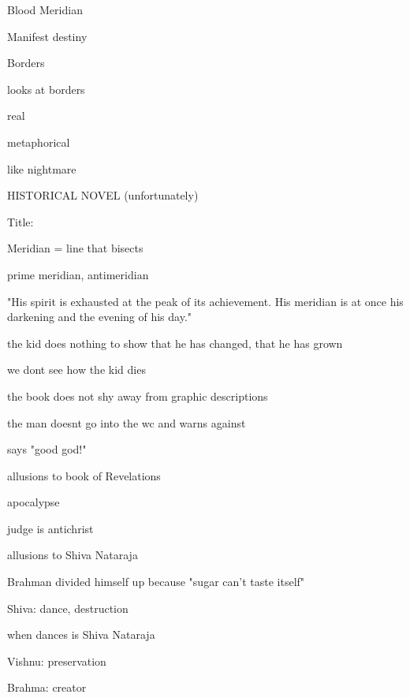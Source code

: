 \documentclass{article}
\begin{document}
Blood Meridian \begin{easylist} 
	\item Manifest destiny \begin{easylist}
	\item Borders \begin{easylist}
		\item looks at borders \begin{easylist}
			\item real
			\item metaphorical
	\item like nightmare
	\item HISTORICAL NOVEL (unfortunately)
	\item Title: \begin{easylist}
		\item Meridian = line that bisects \begin{easylist}
			\item prime meridian, antimeridian
			\item "His spirit is exhausted at the peak of its
			achievement. His meridian is at once his darkening and the evening of his day."
	\item the kid does nothing to show that he has changed, that he has grown
	\item we dont see how the kid dies \begin{easylist}
		\item the book does not shy away from graphic descriptions
		\item the man doesnt go into the wc and warns against
		\item says "good god!"
	\item allusions to book of Revelations \begin{easylist}
		\item apocalypse
		\item judge is antichrist
	\item allusions to Shiva Nataraja \begin{easylist}
		\item Brahman divided himself up because "sugar can't taste itself" \begin{easylist}
			\item Shiva: dance, destruction \begin{easylist}
				\item when dances is Shiva Nataraja
			\item Vishnu: preservation
			\item Brahma: creator

\end{easylist}
\end{easylist}
\end{easylist}
\end{easylist}
\end{easylist}
\end{easylist}
\end{easylist}
\end{easylist}
\end{easylist}
\end{easylist}
\end{easylist}
\end{document}
